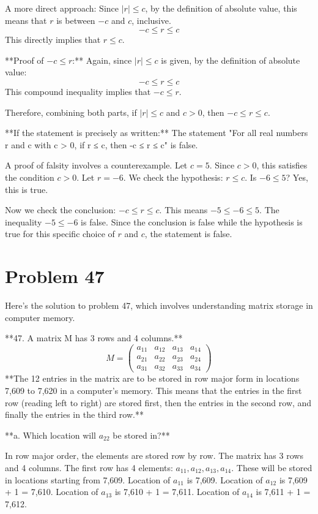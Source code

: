 \documentclass{article}
\begin{document}
A more direct approach:
Since $|r| \le c$, by the definition of absolute value, this means that $r$ is between $-c$ and $c$, inclusive.
$$ -c \le r \le c $$
This directly implies that $r \le c$.

**Proof of $-c \le r$:**
Again, since $|r| \le c$ is given, by the definition of absolute value:
$$ -c \le r \le c $$
This compound inequality implies that $-c \le r$.

Therefore, combining both parts, if $|r| \le c$ and $c > 0$, then $-c \le r \le c$.

**If the statement is precisely as written:**
The statement "For all real numbers r and c with c > 0, if r ≤ c, then -c ≤ r ≤ c" is false.

A proof of falsity involves a counterexample.
Let $c = 5$. Since $c > 0$, this satisfies the condition $c > 0$.
Let $r = -6$.
We check the hypothesis: $r \le c$.
Is $-6 \le 5$? Yes, this is true.

Now we check the conclusion: $-c \le r \le c$.
This means $-5 \le -6 \le 5$.
The inequality $-5 \le -6$ is false.
Since the conclusion is false while the hypothesis is true for this specific choice of $r$ and $c$, the statement is false.

\newpage

\section*{Problem 47}
Here's the solution to problem 47, which involves understanding matrix storage in computer memory.

**47. A matrix M has 3 rows and 4 columns.**
$$
M = \begin{pmatrix}
a_{11} & a_{12} & a_{13} & a_{14} \\
a_{21} & a_{22} & a_{23} & a_{24} \\
a_{31} & a_{32} & a_{33} & a_{34}
\end{pmatrix}
$$
**The 12 entries in the matrix are to be stored in row major form in locations 7,609 to 7,620 in a computer's memory. This means that the entries in the first row (reading left to right) are stored first, then the entries in the second row, and finally the entries in the third row.**

**a. Which location will $a_{22}$ be stored in?**

In row major order, the elements are stored row by row. The matrix has 3 rows and 4 columns.
The first row has 4 elements: $a_{11}, a_{12}, a_{13}, a_{14}$.
These will be stored in locations starting from 7,609.
Location of $a_{11}$ is 7,609.
Location of $a_{12}$ is 7,609 + 1 = 7,610.
Location of $a_{13}$ is 7,610 + 1 = 7,611.
Location of $a_{14}$ is 7,611 + 1 = 7,612.
\end{document}
